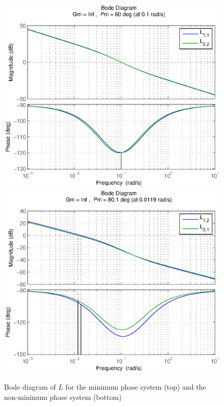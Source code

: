 \begin{figure}[h!b]
    \includegraphics[width=\columnwidth]{fig/Lm321.eps}
    \includegraphics[width=\columnwidth]{fig/Lnm321.eps}
    \caption{Bode diagram of $L$ for the minimum phase system (top) and the non-minimum phase system (bottom)}
    \label{bode321}
    \label{bode321}
\end{figure}
